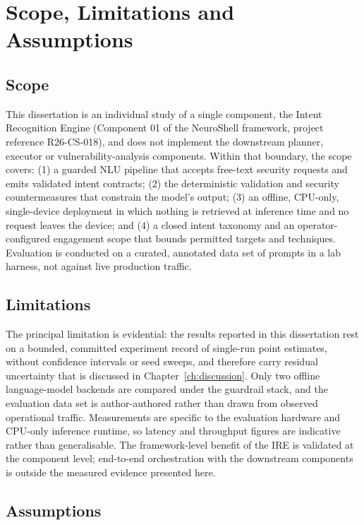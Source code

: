 \section{Scope, Limitations and Assumptions}\label{sec:scope-limitations-assumptions}

\subsection*{Scope}

This dissertation is an individual study of a single component, the Intent
Recognition Engine (Component 01 of the NeuroShell framework, project reference
R26-CS-018), and does not implement the downstream planner, executor or
vulnerability-analysis components. Within that boundary, the scope covers:
(1) a guarded NLU pipeline that accepts free-text security requests and emits
validated intent contracts; (2) the deterministic validation and security
countermeasures that constrain the model's output; (3) an offline, CPU-only,
single-device deployment in which nothing is retrieved at inference time and no
request leaves the device; and (4) a closed intent taxonomy and an
operator-configured engagement scope that bounds permitted targets and
techniques. Evaluation is conducted on a curated, annotated data set of prompts
in a lab harness, not against live production traffic.

\subsection*{Limitations}

The principal limitation is evidential: the results reported in this
dissertation rest on a bounded, committed experiment record of
single-run point estimates, without confidence intervals or seed sweeps, and
therefore carry residual uncertainty that is discussed in
Chapter~\ref{ch:discussion}. Only two offline language-model backends are
compared under the guardrail stack, and the evaluation data set is
author-authored rather than drawn from observed operational traffic.
Measurements are specific to the evaluation hardware and CPU-only inference
runtime, so latency and throughput figures are indicative rather than
generalisable. The framework-level benefit of the IRE is validated at the
component level; end-to-end orchestration with the downstream components is
outside the measured evidence presented here.

\subsection*{Assumptions}

